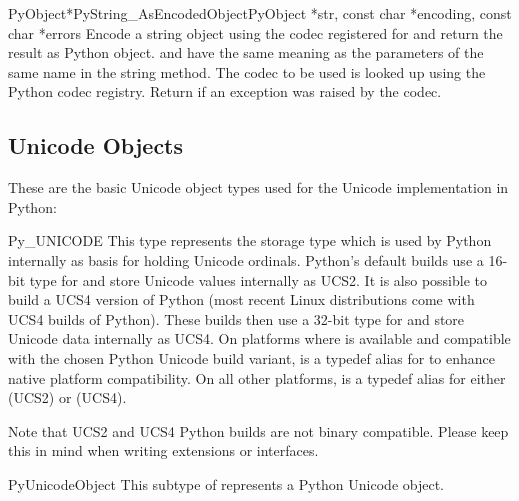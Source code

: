 \begin{cfuncdesc}{PyObject*}{PyString_AsEncodedObject}{PyObject *str,
                                               const char *encoding,
                                               const char *errors}
  Encode a string object using the codec registered for
   and return the result as Python object.
   and  have the same meaning as the
  parameters of the same name in the string  method.
  The codec to be used is looked up using the Python codec registry.
  Return \NULL{} if an exception was raised by the codec.
\end{cfuncdesc}


\subsection{Unicode Objects \label{unicodeObjects}}


These are the basic Unicode object types used for the Unicode
implementation in Python:

\begin{ctypedesc}{Py_UNICODE}
  This type represents the storage type which is used by Python
  internally as basis for holding Unicode ordinals.  Python's default
  builds use a 16-bit type for  and store Unicode
  values internally as UCS2. It is also possible to build a UCS4
  version of Python (most recent Linux distributions come with UCS4
  builds of Python). These builds then use a 32-bit type for
   and store Unicode data internally as UCS4. On
  platforms where  is available and compatible with the
  chosen Python Unicode build variant,  is a typedef
  alias for  to enhance native platform compatibility.
  On all other platforms,  is a typedef alias for
  either  (UCS2) or 
  (UCS4).
\end{ctypedesc}

Note that UCS2 and UCS4 Python builds are not binary compatible.
Please keep this in mind when writing extensions or interfaces.

\begin{ctypedesc}{PyUnicodeObject}
  This subtype of  represents a Python Unicode object.
\end{ctypedesc}

